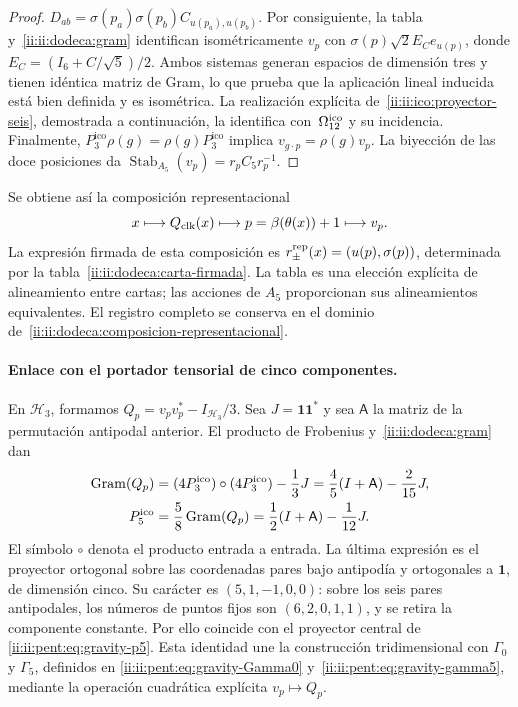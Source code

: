 \begin{proof}
\(D_{ab}=\sigma(p_a)\sigma(p_b)C_{u(p_a),u(p_b)}\).
Por consiguiente, la tabla y~\eqref{ii:ii:dodeca:gram} identifican
isométricamente \(v_p\) con
\(\sigma(p)\sqrt2 E_Ce_{u(p)}\), donde
\(E_C=(I_6+C/\sqrt5)/2\). Ambos sistemas generan espacios de dimensión
tres y tienen idéntica matriz de Gram, lo que prueba que la aplicación
lineal inducida está bien definida y es isométrica. La realización
explícita de~\eqref{ii:ii:ico:proyector-seis}, demostrada a continuación,
la identifica con~\(\Omega_{12}^{\rm ico}\) y su incidencia.
Finalmente, \(P_3^{\mathrm{ico}}\rho(g)=\rho(g)P_3^{\mathrm{ico}}\) implica
\(v_{g\cdot p}=\rho(g)v_p\). La biyección de las doce posiciones da
\(\operatorname{Stab}_{A_5}(v_p)=r_pC_5r_p^{-1}\).
\end{proof}

Se obtiene así la composición representacional
\begin{equation}
 x\longmapsto Q_{\rm clk}(x)\longmapsto
 p=\beta(\theta(x))+1\longmapsto v_p.
 \label{ii:ii:dodeca:composicion-representacional}
\end{equation}
La expresión firmada de esta composición es
\(r_\pm^{\rm rep}(x)=(u(p),\sigma(p))\), determinada por la
tabla~\eqref{ii:ii:dodeca:carta-firmada}. La tabla es una elección explícita
de alineamiento entre cartas; las acciones de \(A_5\) proporcionan sus
alineamientos equivalentes. El registro completo se conserva en el
dominio de~\eqref{ii:ii:dodeca:composicion-representacional}.

\paragraph{Enlace con el portador tensorial de cinco componentes.}
En \(\mathcal H_3\), formamos
\(Q_p=v_pv_p^*-I_{\mathcal H_3}/3\). Sea \(J=\mathbf1\mathbf1^*\)
y sea \(\mathsf A\) la matriz de la permutación antipodal anterior.
El producto de Frobenius y~\eqref{ii:ii:dodeca:gram} dan
\begin{equation}
 \begin{aligned}
 \operatorname{Gram}(Q_p)
 &=(4P_3^{\mathrm{ico}})\circ(4P_3^{\mathrm{ico}})-\frac13J
 =\frac45(I+\mathsf A)-\frac2{15}J,
 \\
 P^{\rm ico}_5&=\frac58\operatorname{Gram}(Q_p)
 =\frac12(I+\mathsf A)-\frac1{12}J.
 \end{aligned}
 \label{ii:ii:dodeca:puente-tensorial}
\end{equation}
El símbolo \(\circ\) denota el producto entrada a entrada. La última
expresión es el proyector ortogonal sobre las coordenadas pares bajo
antipodía y ortogonales a \(\mathbf1\), de dimensión cinco. Su carácter
es \((5,1,-1,0,0)\): sobre los seis pares antipodales, los números de
puntos fijos son \((6,2,0,1,1)\), y se retira la componente constante.
Por ello coincide con el proyector central de
\eqref{ii:ii:pent:eq:gravity-p5}. Esta identidad une la construcción
tridimensional con \(\Gamma_0\) y \(\Gamma_5\), definidos en
\eqref{ii:ii:pent:eq:gravity-Gamma0} y~\eqref{ii:ii:pent:eq:gravity-gamma5},
mediante la operación cuadrática explícita \(v_p\mapsto Q_p\).

